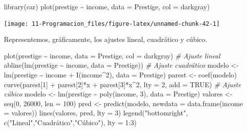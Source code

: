 \documentclass[
]{book}
\newenvironment{Shaded}{\begin{snugshade}}{\end{snugshade}}
\newcommand{\AttributeTok}[1]{\textcolor[rgb]{0.77,0.63,0.00}{#1}}
\newcommand{\CommentTok}[1]{\textcolor[rgb]{0.56,0.35,0.01}{\textit{#1}}}
\newcommand{\ConstantTok}[1]{\textcolor[rgb]{0.00,0.00,0.00}{#1}}
\newcommand{\DecValTok}[1]{\textcolor[rgb]{0.00,0.00,0.81}{#1}}
\newcommand{\FunctionTok}[1]{\textcolor[rgb]{0.00,0.00,0.00}{#1}}
\newcommand{\NormalTok}[1]{#1}
\newcommand{\OtherTok}[1]{\textcolor[rgb]{0.56,0.35,0.01}{#1}}
\newcommand{\SpecialCharTok}[1]{\textcolor[rgb]{0.00,0.00,0.00}{#1}}
\newcommand{\StringTok}[1]{\textcolor[rgb]{0.31,0.60,0.02}{#1}}
\theoremstyle{break}
\begin{document}
\begin{Shaded}
\begin{Highlighting}[]
\FunctionTok{library}\NormalTok{(car)}
\FunctionTok{plot}\NormalTok{(prestige }\SpecialCharTok{\textasciitilde{}}\NormalTok{ income, }\AttributeTok{data =}\NormalTok{ Prestige, }\AttributeTok{col =} \StringTok{\textquotesingle{}darkgray\textquotesingle{}}\NormalTok{)}
\end{Highlighting}
\end{Shaded}

\begin{center}\texttt{[image: 11-Programacion\_files/figure-latex/unnamed-chunk-42-1]} \end{center}

Representemos, gráficamente, los ajustes lineal, cuadrático y cúbico.

\begin{Shaded}
\begin{Highlighting}[]
\FunctionTok{plot}\NormalTok{(prestige }\SpecialCharTok{\textasciitilde{}}\NormalTok{ income, }\AttributeTok{data =}\NormalTok{ Prestige, }\AttributeTok{col =} \StringTok{\textquotesingle{}darkgray\textquotesingle{}}\NormalTok{)}
\CommentTok{\# Ajuste lineal}
\FunctionTok{abline}\NormalTok{(}\FunctionTok{lm}\NormalTok{(prestige }\SpecialCharTok{\textasciitilde{}}\NormalTok{ income, }\AttributeTok{data =}\NormalTok{ Prestige))}
\CommentTok{\# Ajuste cuadrático}
\NormalTok{modelo }\OtherTok{\textless{}{-}} \FunctionTok{lm}\NormalTok{(prestige }\SpecialCharTok{\textasciitilde{}}\NormalTok{ income }\SpecialCharTok{+} \FunctionTok{I}\NormalTok{(income}\SpecialCharTok{\^{}}\DecValTok{2}\NormalTok{), }\AttributeTok{data =}\NormalTok{ Prestige)}
\NormalTok{parest }\OtherTok{\textless{}{-}} \FunctionTok{coef}\NormalTok{(modelo)}
\FunctionTok{curve}\NormalTok{(parest[}\DecValTok{1}\NormalTok{] }\SpecialCharTok{+}\NormalTok{ parest[}\DecValTok{2}\NormalTok{]}\SpecialCharTok{*}\NormalTok{x }\SpecialCharTok{+}\NormalTok{ parest[}\DecValTok{3}\NormalTok{]}\SpecialCharTok{*}\NormalTok{x}\SpecialCharTok{\^{}}\DecValTok{2}\NormalTok{, }\AttributeTok{lty =} \DecValTok{2}\NormalTok{, }\AttributeTok{add =} \ConstantTok{TRUE}\NormalTok{)}
\CommentTok{\# Ajuste cúbico}
\NormalTok{modelo }\OtherTok{\textless{}{-}} \FunctionTok{lm}\NormalTok{(prestige }\SpecialCharTok{\textasciitilde{}} \FunctionTok{poly}\NormalTok{(income, }\DecValTok{3}\NormalTok{), }\AttributeTok{data =}\NormalTok{ Prestige)}
\NormalTok{valores }\OtherTok{\textless{}{-}} \FunctionTok{seq}\NormalTok{(}\DecValTok{0}\NormalTok{, }\DecValTok{26000}\NormalTok{, }\AttributeTok{len =} \DecValTok{100}\NormalTok{)}
\NormalTok{pred }\OtherTok{\textless{}{-}} \FunctionTok{predict}\NormalTok{(modelo, }\AttributeTok{newdata =} \FunctionTok{data.frame}\NormalTok{(}\AttributeTok{income =}\NormalTok{ valores))}
\FunctionTok{lines}\NormalTok{(valores, pred, }\AttributeTok{lty =} \DecValTok{3}\NormalTok{)}
\FunctionTok{legend}\NormalTok{(}\StringTok{"bottomright"}\NormalTok{, }\FunctionTok{c}\NormalTok{(}\StringTok{"Lineal"}\NormalTok{,}\StringTok{"Cuadrático"}\NormalTok{,}\StringTok{"Cúbico"}\NormalTok{), }\AttributeTok{lty =} \DecValTok{1}\SpecialCharTok{:}\DecValTok{3}\NormalTok{)}
\end{Highlighting}
\end{Shaded}
\end{document}
